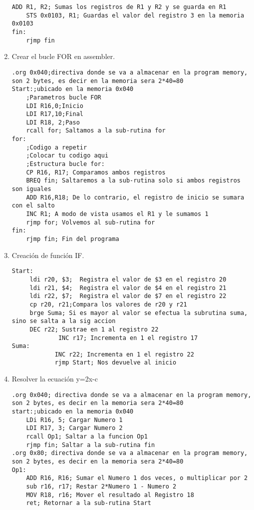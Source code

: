 \documentclass[
	12pt, %
	fleqn, %
	a4paper, %
	oneside, %
]{LegrandOrangeBook}
\begin{document}
\begin{enumerate}
\begin{lstlisting}[language={[RISC-V]Assembler},frame=single,caption={Movimiento de datos en la SRAM},captionpos=b,numbers=none]
	ADD R1, R2; Sumas los registros de R1 y R2 y se guarda en R1
	STS 0x0103, R1; Guardas el valor del registro 3 en la memoria 0x0103
fin:
	rjmp fin
\end{lstlisting}
\item Crear el bucle FOR en assembler.
\begin{lstlisting}[language={[RISC-V]Assembler},frame=single,caption={Bucle FOR en assembler},captionpos=b,numbers=none]
.org 0x040;directiva donde se va a almacenar en la program memory, son 2 bytes, es decir en la memoria sera 2*40=80
Start:;ubicado en la memoria 0x040
	;Parametros bucle FOR
	LDI R16,0;Inicio
	LDI R17,10;Final
	LDI R18, 2;Paso
	rcall for; Saltamos a la sub-rutina for
for:
	;Codigo a repetir
	;Colocar tu codigo aqui
	;Estructura bucle for:
	CP R16, R17; Comparamos ambos registros
	BREQ fin; Saltaremos a la sub-rutina solo si ambos registros son iguales
	ADD R16,R18; De lo contrario, el registro de inicio se sumara con el salto
	INC R1; A modo de vista usamos el R1 y le sumamos 1
	rjmp for; Volvemos al sub-rutina for
fin:
	rjmp fin; Fin del programa
\end{lstlisting}
\item Creación de función IF.
\begin{lstlisting}[language={[RISC-V]Assembler},frame=single,caption={Comparación con ``if''},captionpos=b,numbers=none]
Start:
	 ldi r20, $3;  Registra el valor de $3 en el registro 20
	 ldi r21, $4;  Registra el valor de $4 en el registro 21
	 ldi r22, $7;  Registra el valor de $7 en el registro 22
	 cp r20, r21;Compara los valores de r20 y r21
	 brge Suma; Si es mayor al valor se efectua la subrutina suma, sino se salta a la sig accion
	 DEC r22; Sustrae en 1 al registro 22
             INC r17; Incrementa en 1 el registro 17
Suma:
            INC r22; Incrementa en 1 el registro 22
            rjmp Start; Nos devuelve al inicio
\end{lstlisting}
\item Resolver la ecuación y=2x-c
\begin{lstlisting}[language={[RISC-V]Assembler},frame=single,caption={Solución a una ecuación lineal},captionpos=b,numbers=none]
.org 0x040; directiva donde se va a almacenar en la program memory, son 2 bytes, es decir en la memoria sera 2*40=80
start:;ubicado en la memoria 0x040
	LDi R16, 5; Cargar Numero 1
	LDI R17, 3; Cargar Numero 2
	rcall Op1; Saltar a la funcion Op1
	rjmp fin; Saltar a la sub-rutina fin
.org 0x80; directiva donde se va a almacenar en la program memory, son 2 bytes, es decir en la memoria sera 2*40=80
Op1:
	ADD R16, R16; Sumar el Numero 1 dos veces, o multiplicar por 2
	sub r16, r17; Restar 2*Numero 1 - Numero 2
	MOV R18, r16; Mover el resultado al Registro 18
	ret; Retornar a la sub-rutina Start


\end{lstlisting}
\end{enumerate}
\end{document}

